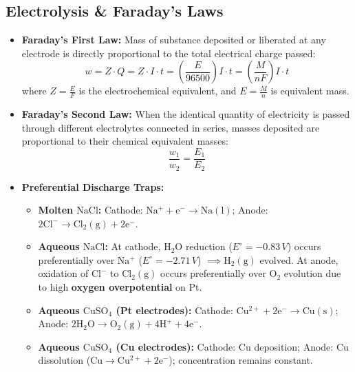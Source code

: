 \documentclass[10pt,a4paper]{article}
\begin{document}
\subsection{Electrolysis \& Faraday's Laws}
\begin{itemize}
  \item \textbf{Faraday's First Law:} Mass of substance deposited or liberated at any electrode is directly proportional to the total electrical charge passed:
  \begin{equation}
    w = Z \cdot Q = Z \cdot I \cdot t = \left(\frac{E}{96500}\right) I \cdot t = \left(\frac{M}{n F}\right) I \cdot t
  \end{equation}
  where $Z = \frac{E}{F}$ is the electrochemical equivalent, and $E = \frac{M}{n}$ is equivalent mass.
  \item \textbf{Faraday's Second Law:} When the identical quantity of electricity is passed through different electrolytes connected in series, masses deposited are proportional to their chemical equivalent masses:
  \begin{equation}
    \frac{w_1}{w_2} = \frac{E_1}{E_2}
  \end{equation}
  \item \textbf{Preferential Discharge Traps:}
  \begin{itemize}
    \item \textbf{Molten $\mathrm{NaCl}$:} Cathode: $\mathrm{Na^+ + e^- \to Na(l)}$; Anode: $\mathrm{2Cl^- \to Cl_2(g) + 2e^-}$.
    \item \textbf{Aqueous $\mathrm{NaCl}$:} At cathode, $\mathrm{H_2O}$ reduction ($E^\circ = -0.83\,\si{V}$) occurs preferentially over $\mathrm{Na^+}$ ($E^\circ = -2.71\,\si{V}$) $\implies \mathrm{H_2(g)}$ evolved. At anode, oxidation of $\mathrm{Cl^-}$ to $\mathrm{Cl_2(g)}$ occurs preferentially over $\mathrm{O_2}$ evolution due to high \textbf{oxygen overpotential} on Pt.
    \item \textbf{Aqueous $\mathrm{CuSO_4}$ (Pt electrodes):} Cathode: $\mathrm{Cu^{2+} + 2e^- \to Cu(s)}$; Anode: $\mathrm{2H_2O \to O_2(g) + 4H^+ + 4e^-}$.
    \item \textbf{Aqueous $\mathrm{CuSO_4}$ (Cu electrodes):} Cathode: Cu deposition; Anode: Cu dissolution ($\mathrm{Cu \to Cu^{2+} + 2e^-}$); concentration remains constant.
  \end{itemize}
\end{itemize}
\end{document}
